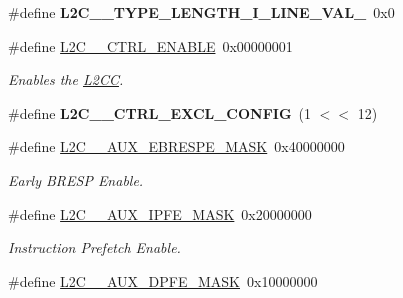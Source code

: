 \begin{DoxyCompactItemize}
\mbox{\label{group__L2C-310__cache_ga68a6cde2e410fddd13613de4eb5b0260}} 
\#define {\bfseries L2\+C\+\_\+\_\+\+T\+Y\+P\+E\+\_\+\+L\+E\+N\+G\+T\+H\+\_\+\+I\+\_\+\+L\+I\+N\+E\+\_\+\+V\+A\+L\+\_}~0x0
\item 
\mbox{\label{group__L2C-310__cache_ga84e848efde9b5705e3f71421b266b821}} 
\#define \mbox{\hyperlink{group__L2C-310__cache_ga84e848efde9b5705e3f71421b266b821}{L2\+C\+\_\+\_\+\+C\+T\+R\+L\+\_\+\+E\+N\+A\+B\+LE}}~0x00000001
\begin{DoxyCompactList}\small\item\em Enables the \mbox{\hyperlink{structL2CC}{L2\+CC}}. \end{DoxyCompactList}\item 
\mbox{\label{group__L2C-310__cache_gaf1f5b4af579a4d4f212e78ab67037f29}} 
\#define {\bfseries L2\+C\+\_\+\_\+\+C\+T\+R\+L\+\_\+\+E\+X\+C\+L\+\_\+\+C\+O\+N\+F\+IG}~(1 $<$$<$ 12)
\item 
\mbox{\label{group__L2C-310__cache_gaa163ad72e4df13d918c70679b3b659ed}} 
\#define \mbox{\hyperlink{group__L2C-310__cache_gaa163ad72e4df13d918c70679b3b659ed}{L2\+C\+\_\+\_\+\+A\+U\+X\+\_\+\+E\+B\+R\+E\+S\+P\+E\+\_\+\+M\+A\+SK}}~0x40000000
\begin{DoxyCompactList}\small\item\em Early B\+R\+E\+SP Enable. \end{DoxyCompactList}\item 
\mbox{\label{group__L2C-310__cache_ga6cd5fb6fd4558e019c717a3855f1777b}} 
\#define \mbox{\hyperlink{group__L2C-310__cache_ga6cd5fb6fd4558e019c717a3855f1777b}{L2\+C\+\_\+\_\+\+A\+U\+X\+\_\+\+I\+P\+F\+E\+\_\+\+M\+A\+SK}}~0x20000000
\begin{DoxyCompactList}\small\item\em Instruction Prefetch Enable. \end{DoxyCompactList}\item 
\mbox{\label{group__L2C-310__cache_gada64dbcdccc0269d7d76da979cf856aa}} 
\#define \mbox{\hyperlink{group__L2C-310__cache_gada64dbcdccc0269d7d76da979cf856aa}{L2\+C\+\_\+\_\+\+A\+U\+X\+\_\+\+D\+P\+F\+E\+\_\+\+M\+A\+SK}}~0x10000000
$$
\end{DoxyCompactItemize}
